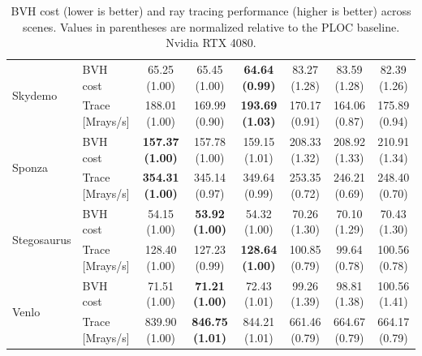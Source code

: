 \begin{table}[!ht]
{\begin{tabular}{llcccccc}
        \hline
        \multirow{2}{*}{Skydemo}
        & BVH cost & 65.25 (1.00) & 65.45 (1.00) & \textbf{64.64 (0.99)} & 83.27 (1.28) & 83.59 (1.28) & 82.39 (1.26) \\
        & Trace [Mrays/s] & 188.01 (1.00) & 169.99 (0.90) & \textbf{193.69 (1.03)} & 170.17 (0.91) & 164.06 (0.87) & 175.89 (0.94) \\

        \hline
        \multirow{2}{*}{Sponza}
        & BVH cost & \textbf{157.37 (1.00)} & 157.78 (1.00) & 159.15 (1.01) & 208.33 (1.32) & 208.92 (1.33) & 210.91 (1.34) \\
        & Trace [Mrays/s] & \textbf{354.31 (1.00)} & 345.14 (0.97) & 349.64 (0.99) & 253.35 (0.72) & 246.21 (0.69) & 248.40 (0.70) \\

        \hline
        \multirow{2}{*}{Stegosaurus}
        & BVH cost & 54.15 (1.00) & \textbf{53.92 (1.00)} & 54.32 (1.00) & 70.26 (1.30) & 70.10 (1.29) & 70.43 (1.30) \\
        & Trace [Mrays/s] & 128.40 (1.00) & 127.23 (0.99) & \textbf{128.64 (1.00)} & 100.85 (0.79) & 99.64 (0.78) & 100.56 (0.78) \\

        \hline
        \multirow{2}{*}{Venlo}
        & BVH cost & 71.51 (1.00) & \textbf{71.21 (1.00)} & 72.43 (1.01) & 99.26 (1.39) & 98.81 (1.38) & 100.56 (1.41) \\
        & Trace [Mrays/s] & 839.90 (1.00) & \textbf{846.75 (1.01)} & 844.21 (1.01) & 661.46 (0.79) & 664.67 (0.79) & 664.17 (0.79) \\

        \hline
    \end{tabular}
    }
    \caption{BVH cost (lower is better) and ray tracing performance (higher is better) across scenes. Values in parentheses are normalized relative to the PLOC baseline. Nvidia RTX 4080.}
    \label{tab:bvh-cost-trace-4080}
\end{table}

